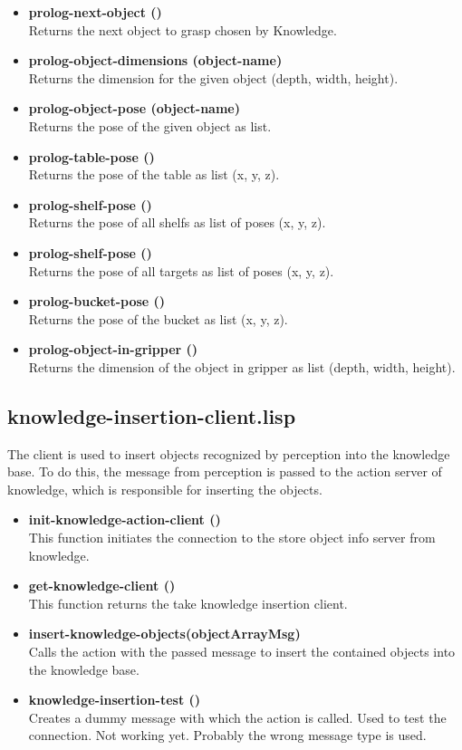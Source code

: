\documentclass[main.tex]{subfiles}
\begin{document}
\begin{itemize}
				\item \textbf{prolog-next-object ()} \\ Returns the next object to grasp chosen by Knowledge.
		    \item \textbf{prolog-object-dimensions (object-name)} \\ Returns the dimension for the given object (depth, width, height).
				\item \textbf{prolog-object-pose (object-name)} \\ Returns the pose of the given object as list.
				\item \textbf{prolog-table-pose ()} \\ Returns the pose of the table as list (x, y, z).
				\item \textbf{prolog-shelf-pose ()} \\ Returns the pose of all shelfs as list of poses (x, y, z).
				\item \textbf{prolog-shelf-pose ()} \\ Returns the pose of all targets as list of poses (x, y, z).
				\item \textbf{prolog-bucket-pose ()} \\ Returns the pose of the bucket as list (x, y, z).
				\item \textbf{prolog-object-in-gripper ()} \\ Returns the dimension of the object in gripper as list (depth, width, height).
			\end{itemize} 
		\subsection{knowledge-insertion-client.lisp}
		\label{knowledge-insertion}
		The client is used to insert objects recognized by perception into the knowledge base. To do this, the message from perception is passed to the action server of knowledge, which is responsible for inserting the objects.
		\begin{itemize}
		  \item \textbf{init-knowledge-action-client ()} \\
		  This function initiates the connection to the store object info server from knowledge.
		  \item \textbf{get-knowledge-client ()}  \\
		  This function returns the take knowledge insertion client.
		  \item \textbf{insert-knowledge-objects(objectArrayMsg)} \\
		  Calls the action with the passed message to insert the contained objects into the knowledge base.
		  \item \textbf{knowledge-insertion-test ()} \\
		  Creates a dummy message with which the action is called. Used to test the connection. Not working yet. Probably the wrong message type is used.
		\end{itemize}
\end{document}
